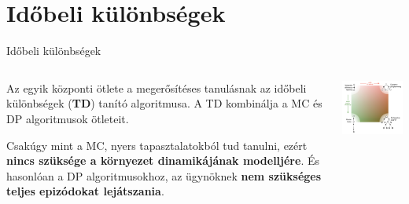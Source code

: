 \documentclass[english, aspectratio=169]{beamer}
\makeatletter
\let\origtableofcontents=\tableofcontents
\def\tableofcontents{\@ifnextchar[{\origtableofcontents}{\gobbletableofcontents}}
\def\gobbletableofcontents#1{\origtableofcontents}
\makeatother
\begin{document}
\section{Időbeli különbségek}

\begin{frame}
\tableofcontents[currentsection]
\end{frame}

\begin{frame}{Időbeli különbségek}
\begin{columns}
\begin{column}{.5\textwidth}
Az egyik központi ötlete a megerősítéses tanulásnak az időbeli különbségek (\textbf{TD}) tanító algoritmusa. A TD kombinálja a MC és DP algoritmusok ötleteit. \par\smallskip
Csakúgy mint a MC, nyers tapasztalatokból tud tanulni, ezért \textbf{nincs szüksége a környezet dinamikájának modelljére}. És hasonlóan a DP algoritmusokhoz, az ügynöknek \textbf{nem szükséges teljes epizódokat lejátszania}.
\end{column}
\begin{column}{.5\textwidth}
\begin{center}
\includegraphics[width=7cm, keepaspectratio]{images/mc_td_7.png}
\end{center}
\end{column}
\end{columns}
\end{frame}
\end{document}
